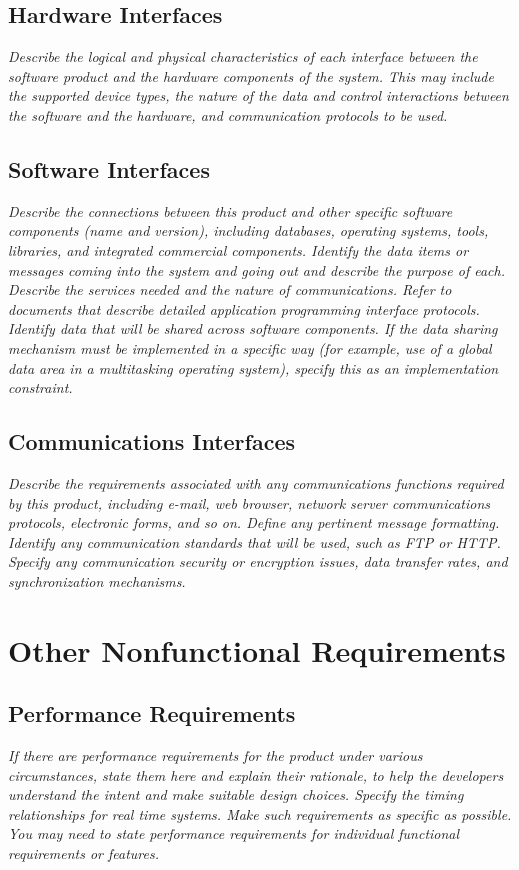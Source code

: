 \documentclass{article}
\begin{document}
\subsection{Hardware Interfaces}
\emph{Describe the logical and physical characteristics of each interface between the software product and the hardware components of the system. This may include the supported device types, the nature of the data and control interactions between the software and the hardware, and communication protocols to be used.}
\subsection{Software Interfaces}
\emph{Describe the connections between this product and other specific software components (name and version), including databases, operating systems, tools, libraries, and integrated commercial components. Identify the data items or messages coming into the system and going out and describe the purpose of each. Describe the services needed and the nature of communications. Refer to documents that describe detailed application programming interface protocols. Identify data that will be shared across software components. If the data sharing mechanism must be implemented in a specific way (for example, use of a global data area in a multitasking operating system), specify this as an implementation constraint.}
\subsection{Communications Interfaces}
\emph{Describe the requirements associated with any communications functions required by this product, including e-mail, web browser, network server communications protocols, electronic forms, and so on. Define any pertinent message formatting. Identify any communication standards that will be used, such as FTP or HTTP. Specify any communication security or encryption issues, data transfer rates, and synchronization mechanisms.}
\section{Other Nonfunctional Requirements}
\subsection{Performance Requirements}
\emph{If there are performance requirements for the product under various circumstances, state them here and explain their rationale, to help the developers understand the intent and make suitable design choices. Specify the timing relationships for real time systems. Make such requirements as specific as possible. You may need to state performance requirements for individual functional requirements or features.}
\end{document}

